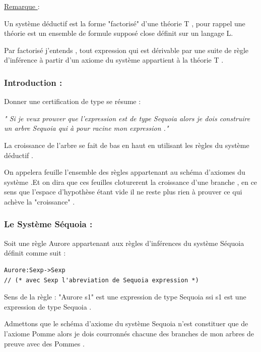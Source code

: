 \documentclass{article}
\begin{document}
\noindent \underline{Remarque }:

\medskip


\noindent Un système déductif est la forme "factorisé" d'une théorie T , pour rappel une théorie est un ensemble de formule supposé close définit sur un langage L. 

\noindent Par factorisé j'entends , tout expression qui est dérivable par une suite de règle d'inférence à partir d'un axiome  du système appartient à la théorie T . 



\subsubsection{ Introduction :}

Donner une certification de type se résume : 
\begin{center}
\textit{" Si je veux prouver que l'expression est de type Sequoia alors je dois construire un arbre Sequoia qui à pour racine mon expression ." }
\end{center}

\noindent La croissance de l'arbre se fait de bas en haut en utilisant les règles du système déductif .

\medskip

\noindent On appelera feuille  l'ensemble des règles appartenant au schéma d'axiomes du système .Et on dira que ces feuilles cloturerent la croissance d'une branche , en ce sens que l'espace d'hypothèse étant vide il ne reste plus rien à prouver ce qui achève la "croissance" .

\subsubsection{ Le Système Séquoia :}

Soit une règle  Aurore appartenant aux règles d'inférences du système Séquoia définit comme suit  :
\begin{lstlisting}[style=CStyle]
Aurore:Sexp->Sexp 
// (* avec Sexp l'abreviation de Sequoia expression *)
\end{lstlisting}
Sens de la règle  :  "Aurore s1" est une expression de type Sequoia ssi s1 est une expression de type Sequoia .

\medskip

\noindent Admettons que le schéma d'axiome du système Sequoia n'est constituer que de l'axiome Pomme alors je dois courronnés chacune des branches de mon arbres de preuve avec des Pommes .
\end{document}
